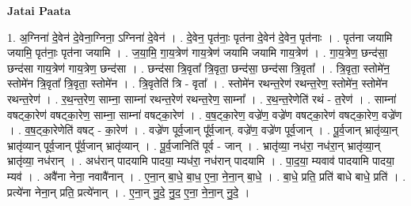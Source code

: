 \documentclass[17pt]{extarticle}
\begin{document}
\textbf{Jatai Paata} \newline

1. अ॒ग्निना॑ दे॒वेन॑ दे॒वेना॒ग्निना॒ ऽग्निना॑ दे॒वेन॑ । . दे॒वेन॒ पृत॑नाः॒ पृत॑ना दे॒वेन॑ दे॒वेन॒ पृत॑नाः । . पृत॑ना जयामि जयामि॒ पृत॑नाः॒ पृत॑ना जयामि । . ज॒या॒मि॒ गा॒य॒त्रेण॑ गाय॒त्रेण॑ जयामि जयामि गाय॒त्रेण॑ । . गा॒य॒त्रेण॒ छन्द॑सा॒ छन्द॑सा गाय॒त्रेण॑ गाय॒त्रेण॒ छन्द॑सा । . छन्द॑सा त्रि॒वृता᳚ त्रि॒वृता॒ छन्द॑सा॒ छन्द॑सा त्रि॒वृता᳚ । . त्रि॒वृता॒ स्तोमे॑न॒ स्तोमे॑न त्रि॒वृता᳚ त्रि॒वृता॒ स्तोमे॑न । . त्रि॒वृतेति॑ त्रि - वृता᳚ । . स्तोमे॑न रथन्त॒रेण॑ रथन्त॒रेण॒ स्तोमे॑न॒ स्तोमे॑न रथन्त॒रेण॑ । . र॒थ॒न्त॒रेण॒ साम्ना॒ साम्ना॑ रथन्त॒रेण॑ रथन्त॒रेण॒ साम्ना᳚ । . र॒थ॒न्त॒रेणेति॑ रथं - त॒रेण॑ । . साम्ना॑ वषट्का॒रेण॑ वषट्का॒रेण॒ साम्ना॒ साम्ना॑ वषट्का॒रेण॑ । . व॒ष॒ट्का॒रेण॒ वज्रे॑ण॒ वज्रे॑ण वषट्का॒रेण॑ वषट्का॒रेण॒ वज्रे॑ण । . व॒ष॒ट्का॒रेणेति॑ वषट् - का॒रेण॑ । . वज्रे॑ण पूर्व॒जान् पू᳚र्व॒जान्. वज्रे॑ण॒ वज्रे॑ण पूर्व॒जान् । . पू॒र्व॒जान् भ्रातृ॑व्या॒न् भ्रातृ॑व्यान् पूर्व॒जान् पू᳚र्व॒जान् भ्रातृ॑व्यान् । . पू॒र्व॒जानिति॑ पूर्व - जान् । . भ्रातृ॑व्या॒ नध॑रा॒ नध॑रा॒न् भ्रातृ॑व्या॒न् भ्रातृ॑व्या॒ नध॑रान् । . अध॑रान् पादयामि पादया॒ म्यध॑रा॒ नध॑रान् पादयामि । . पा॒द॒या॒ म्यवाव॑ पादयामि पादया॒ म्यव॑ । . अवै॑ना नेना॒ नवावै॑नान् । . ए॒ना॒न् बा॒धे॒ बा॒ध॒ ए॒ना॒ ने॒ना॒न् बा॒धे॒ । . बा॒धे॒ प्रति॒ प्रति॑ बाधे बाधे॒ प्रति॑ । . प्रत्ये॑ना नेना॒न् प्रति॒ प्रत्ये॑नान् । . ए॒ना॒न् नु॒दे॒ नु॒द॒ ए॒ना॒ ने॒ना॒न् नु॒दे॒ । \newline
\end{document}
